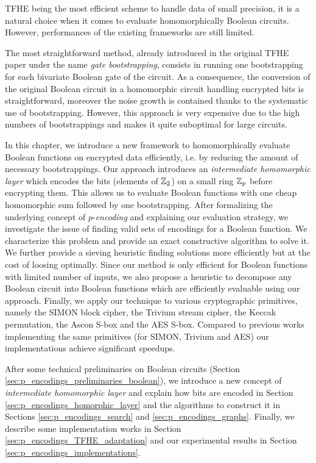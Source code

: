 

\gls{TFHE} being the most efficient scheme to handle data of small precision, it is a natural choice when it comes to evaluate homomorphically Boolean circuits. However, performances of the existing frameworks are still limited. 

The most straightforward method, already introduced in the original \gls{TFHE} paper \cite{JC:CGGI20} under the name \emph{gate bootstrapping}, consists in running one bootstrapping for each bivariate Boolean gate of the circuit. As a consequence, the conversion of the original Boolean circuit in a homomorphic circuit handling encrypted bits is straightforward, moreover the noise growth is contained thanks to the systematic use of bootstrapping. However, this approach is very expensive due to the high numbers of bootstrappings and makes it quite suboptimal for large circuits.


In this chapter, we introduce a new framework to homomorphically evaluate Boolean functions on encrypted data efficiently, i.e. by reducing the amount of necessary bootstrappings. Our approach introduces an \emph{intermediate homomorphic layer} which encodes the bits (elements of $\mathbb{Z}_2$) on a small ring $\mathbb{Z}_p$ before encrypting them. This allows us to evaluate Boolean functions with one cheap homomorphic sum followed by one bootstrapping. After formalizing the underlying concept of $p$-\emph{encoding} and explaining our evaluation strategy, we investigate the issue of finding valid sets of encodings for a Boolean function. We characterize this problem and provide an exact constructive algorithm to solve it. We further provide a sieving heuristic finding solutions more efficiently but at the cost of loosing optimally. Since our method is only efficient for Boolean functions with limited number of inputs, we also propose a heuristic to decompose any Boolean circuit into Boolean functions which are efficiently evaluable using our approach. Finally, we apply our technique to various cryptographic primitives, namely the SIMON block cipher, the Trivium stream cipher, the Keccak permutation, the Ascon S-box and the \gls{AES} S-box. Compared to previous works implementing the same primitives (for SIMON, Trivium and \gls{AES}) our implementations achieve significant speedups.

After some technical preliminaries on Boolean circuits (Section \ref{sec:p_encodings_preliminaries_boolean}), we introduce a new concept of \emph{intermediate homomorphic layer} and explain how bits are encoded  in Section \ref{sec:p_encodings_homorphic_layer} and the algorithms to construct it in Sections \ref{sec:p_encodings_search} and \ref{sec:p_encodings_graphs}. Finally, we describe some implementation works in Section \ref{sec:p_encodings_TFHE_adaptation} and our experimental results in Section \ref{sec:p_encodings_implementations}.










